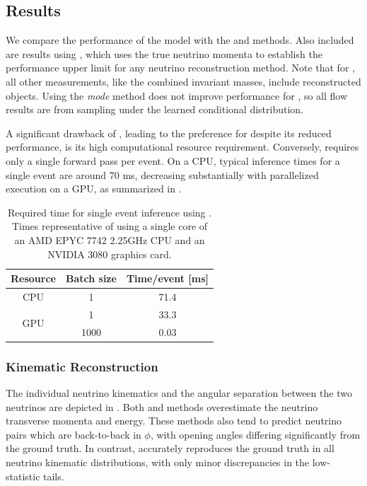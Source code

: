 \subsection{Results}

We compare the performance of the \vvflows model with the \vweight and \ellipse methods.
Also included are results using \vtruth, which uses the true neutrino momenta to establish the performance upper limit for any neutrino reconstruction method.
Note that for \vtruth, all other measurements, like the combined invariant masses, include reconstructed objects.
Using the \textit{mode} method does not improve performance for \vvflows, so all flow results are from sampling under the learned conditional distribution.

A significant drawback of \vweight, leading to the preference for \ellipse despite its reduced performance, is its high computational resource requirement. Conversely, \vflows requires only a single forward pass per event. On a CPU, typical inference times for a single event are around 70 ms, decreasing substantially with parallelized execution on a GPU, as summarized in .

\begin{table}[htbp]
    \centering
    \caption{Required time for single event inference using \vvflows. Times representative of using a single core of an AMD EPYC 7742 2.25GHz CPU and an NVIDIA 3080 graphics card.}
    \label{tab:inf_times}
    \begin{tabular}{c c c}
        \toprule
        Resource & Batch size & Time/event [ms]\\
        \midrule
        CPU & 1 & 71.4\\
        \multirow{2}{*}{GPU} & 1 & 33.3\\
         & 1000 & 0.03\\
        \bottomrule
    \end{tabular}
\end{table}

\subsubsection{Kinematic Reconstruction}

The individual neutrino kinematics and the angular separation between the two neutrinos are depicted in .
Both \vweight and \ellipse methods overestimate the neutrino transverse momenta and energy.
These methods also tend to predict neutrino pairs which are back-to-back in $\phi$, with opening angles differing significantly from the ground truth.
In contrast, \vvflows accurately reproduces the ground truth in all neutrino kinematic distributions, with only minor discrepancies in the low-statistic tails.

